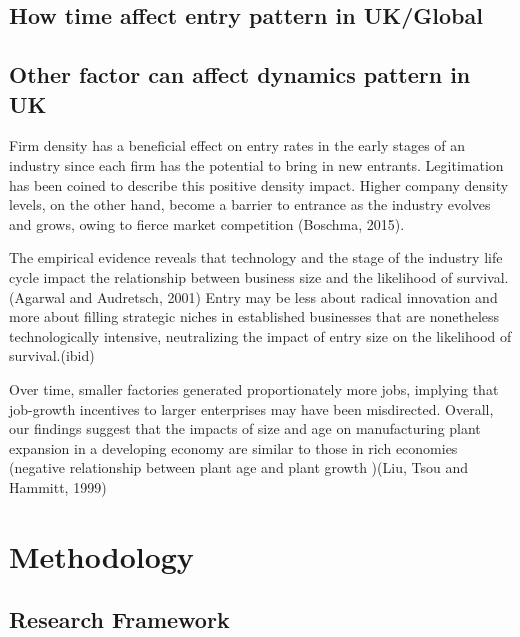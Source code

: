 \documentclass[
  12pt,
  oneside]{book}
\begin{document}
\hypertarget{how-time-affect-entry-pattern-in-ukglobal}{%
\section{How time affect entry pattern in UK/Global}\label{how-time-affect-entry-pattern-in-ukglobal}}

\hypertarget{other-factor-can-affect-dynamics-pattern-in-uk}{%
\section{Other factor can affect dynamics pattern in UK}\label{other-factor-can-affect-dynamics-pattern-in-uk}}

Firm density has a beneficial effect on entry rates in the early stages of an industry since each firm has the potential to bring in new entrants. Legitimation has been coined to describe this positive density impact. Higher company density levels, on the other hand, become a barrier to entrance as the industry evolves and grows, owing to fierce market competition (Boschma, 2015).

The empirical evidence reveals that technology and the stage of the industry life cycle impact the relationship between business size and the likelihood of survival.(Agarwal and Audretsch, 2001)
Entry may be less about radical innovation and more about filling strategic niches in established businesses that are nonetheless technologically intensive, neutralizing the impact of entry size on the likelihood of survival.(ibid)

Over time, smaller factories generated proportionately more jobs, implying that job-growth incentives to larger enterprises may have been misdirected. Overall, our findings suggest that the impacts of size and age on manufacturing plant expansion in a developing economy are similar to those in rich economies (negative relationship between plant age and plant growth )(Liu, Tsou and Hammitt, 1999)

\hypertarget{methodology}{%
\chapter{Methodology}\label{methodology}}

\hypertarget{research-framework}{%
\section{Research Framework}\label{research-framework}}
\end{document}
